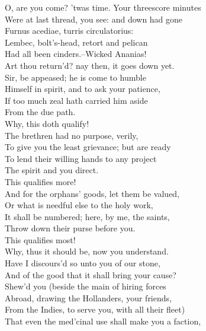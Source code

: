 \documentclass{memoir}
\begin{document}
\begin{drama*}
\subtlespeaks {} O, are you come? 'twas time. Your threescore minutes\\
 Were at last thread, you see: and down had gone\\
 Furnus acediae, turris circulatorius:\\
 Lembec, bolt's-head, retort and pelican\\
 Had all been cinders.--Wicked Ananias!\\
 Art thou return'd? nay then, it goes down yet.\\
\tribulationspeaks  Sir, be appeased; he is come to humble\\
 Himself in spirit, and to ask your patience,\\
 If too much zeal hath carried him aside\\
 From the due path.\\
\subtlespeaks {} Why, this doth qualify!\\
\tribulationspeaks  The brethren had no purpose, verily,\\
 To give you the least grievance; but are ready\\
 To lend their willing hands to any project\\
 The spirit and you direct.\\
\subtlespeaks {} This qualifies more!\\
\tribulationspeaks  And for the orphans' goods, let them be valued,\\
 Or what is needful else to the holy work,\\
 It shall be numbered; here, by me, the saints,\\
 Throw down their purse before you.\\
\subtlespeaks {} This qualifies most!\\
 Why, thus it should be, now you understand.\\
 Have I discours'd so unto you of our stone,\\
 And of the good that it shall bring your cause?\\
 Shew'd you (beside the main of hiring forces\\
 Abroad, drawing the Hollanders, your friends,\\
 From the Indies, to serve you, with all their fleet)\\
 That even the med'cinal use shall make you a faction,\\

\end{drama*}
\end{document}
